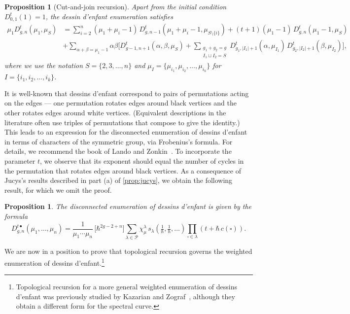 \documentclass[a4paper]{article}
\theoremstyle{plain}
\newtheorem{proposition}[theorem]{Proposition}
\numberwithin{theorem}{section}
\theoremstyle{definition}
\theoremstyle{remark}
\newcommand{\h}{\hbar}
\begin{document}
\begin{proposition} [Cut-and-join recursion] \label{prop:dessincutjoin}
Apart from the initial condition $D^t_{0,1}(1) = 1$, the dessin d'enfant enumeration satisfies
\begin{align*}
\mu_1 D^t_{g,n}(\mu_1, \mu_S) &= \sum_{i=2}^n (\mu_1+\mu_i-1) \, D^t_{g,n-1}(\mu_1+\mu_i-1, \mu_{S \setminus \{i\}}) + (t+1) (\mu_1-1) \, D^t_{g,n}(\mu_1-1, \mu_S) \\
&+ \sum_{\alpha + \beta = \mu_1-1} \alpha \beta \Bigg[ D^t_{g-1,n+1}(\alpha, \beta, \mu_S) + \sum_{\substack{g_1+g_2=g \\ I_1 \sqcup I_2 = S}} D^t_{g_1,|I_1|+1}(\alpha, \mu_{I_1}) \, D^t_{g_2,|I_2|+1}(\beta, \mu_{I_2}) \Bigg],
\end{align*}
where we use the notation $S = \{2, 3, \ldots, n\}$ and $\mu_I = \{\mu_{i_1}, \mu_{i_2}, \ldots, \mu_{i_k}\}$ for $I = \{i_1, i_2, \ldots, i_k\}$.
\end{proposition}


It is well-known that dessins d'enfant correspond to pairs of permutations acting on the edges --- one permutation rotates edges around black vertices and the other rotates edges around white vertices. (Equivalent descriptions in the literature often use triples of permutations that compose to give the identity.) This leads to an expression for the disconnected enumeration of dessins d'enfant in terms of characters of the symmetric group, via Frobenius's formula. For details, we recommend the book of Lando and Zonkin~\cite{lan-zvo04}. To incorporate the parameter $t$, we observe that its exponent should equal the number of cycles in the permutation that rotates edges around black vertices. As a consequence of Jucys's results described in part (a) of \cref{prop:jucys}, we obtain the following result, for which we omit the proof.


\begin{proposition} \label{prop:dessinsrep}
The disconnected enumeration of dessins d'enfant is given by the formula
\[
D_{g,n}^{t\bullet}(\mu_1, \ldots, \mu_n) = \frac{1}{\mu_1 \cdots \mu_n} \, \big[ \h^{2g-2+n} \big] \sum_{\lambda \in \mathcal{P}} \chi^\lambda_\mu \, s_\lambda(\tfrac{1}{\h}, \tfrac{1}{\h}, \ldots) \prod_{\square \in \lambda} \left( t + \h \, c(\square) \right).
\]
\end{proposition}


We are now in a position to prove that topological recursion governs 	the weighted enumeration of dessins d'enfant.\footnote{Topological recursion for a more general weighted enumeration of dessins d'enfant was previously studied by Kazarian and Zograf~\cite{kaz-zog15}, although they obtain a different form for the spectral curve.}
\end{document}
